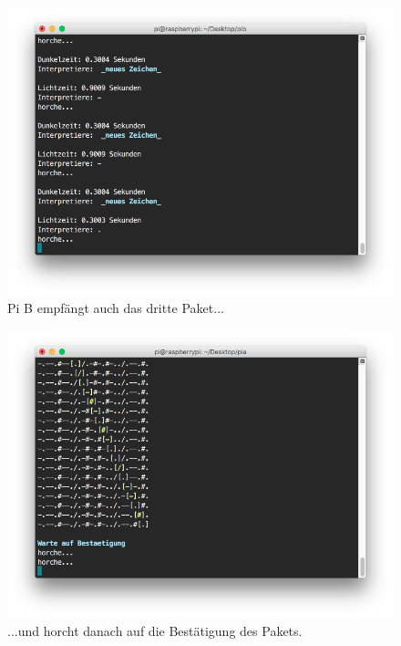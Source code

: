 \documentclass[12pt, a4paper]{article}
\begin{document}
\newpage
\begin{figure}[H]
	\centering
	\includegraphics[width=1.0\textwidth]{sshot_36.png}
	\caption{Pi B empfängt auch das dritte Paket...}
\end{figure}

\newpage
\begin{figure}[H]
	\centering
	\includegraphics[width=1.0\textwidth]{sshot_41.png}
	\caption{...und horcht danach auf die Bestätigung des Pakets.}
\end{figure}
\end{document}
